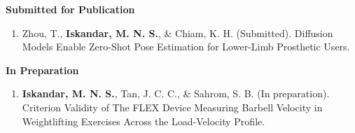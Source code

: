 \documentclass[../main.tex]{subfiles}
\begin{document}
            
        
        \textbf{Submitted for Publication}
        \def\labelprefix{S}
        \begin{enumerate}
            
            
            \item\label{article: diffusion_openpose}{Zhou, T., \textbf{Iskandar, M. N. S.}, \& Chiam, K. H. (Submitted). Diffusion Models Enable Zero-Shot Pose Estimation for Lower-Limb Prosthetic Users.}
        \end{enumerate}

        \textbf{In Preparation}
        \def\labelprefix{P}
        \begin{enumerate}
            
            \item\label{article: fyp}{\textbf{Iskandar, M. N. S.}, Tan, J. C. C., \& Sahrom, S. B. (In preparation). Criterion Validity of The FLEX Device Measuring Barbell Velocity in Weightlifting Exercises Across the Load-Velocity Profile.}
            
        \end{enumerate}
        
  \resumeSubHeadingListEnd
\end{document}
